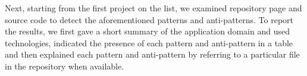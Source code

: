 \documentclass[11pt,a4paper,twocolumn]{article}
\newcommand{\cmark}{\ding{51}}%
\begin{document}
Next, starting from the first project on the list, we examined repository page and source code to detect the aforementioned patterns and anti-patterns.
To report the results, we first gave a short summary of the application domain and used technologies, indicated the presence of each pattern and anti-pattern in a table and then explained each pattern and anti-pattern by referring to a particular file in the repository when available.


\end{document}
